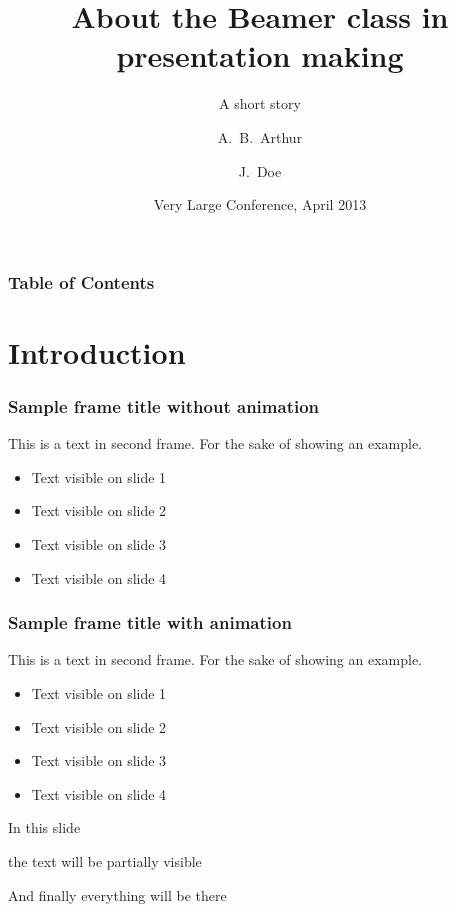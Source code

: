 \documentclass{beamer}
\title[About Beamer] %
{About the Beamer class in presentation making}
\subtitle{A short story}
\author[Arthur, Doe] %
{A.~B.~Arthur\inst{1} \and J.~Doe\inst{2}}
\institute[VFU] %
{
  \inst{1}%
  Faculty of Physics\\
  Very Famous University
  \and
  \inst{2}%
  Faculty of Chemistry\\
  Very Famous University
}
\date[VLC 2020] %
{Very Large Conference, April 2013}
\begin{document}
\frame{\titlepage}

\begin{frame}
\frametitle{Table of Contents}
\tableofcontents
\end{frame}

\section{Introduction}

\begin{frame}
\frametitle{Sample frame title without animation}

This is a text in second frame. For the sake of showing an example.

\begin{itemize}
 \item Text visible on slide 1
 \item Text visible on slide 2
 \item Text visible on slide 3 %
 \item Text visible on slide 4
\end{itemize}

\end{frame}

\begin{frame}
\frametitle{Sample frame title with animation}
This is a text in second frame. For the sake of showing an example.

\begin{itemize}
 \item<1-> Text visible on slide 1
 \item<2-> Text visible on slide 2
 \item<3> Text visible on slide 3 %
 \item<4-> Text visible on slide 4
\end{itemize}

\end{frame}


\begin{frame}
 In this slide \pause

 the text will be partially visible \pause

 And finally everything will be there
\end{frame}
\end{document}
